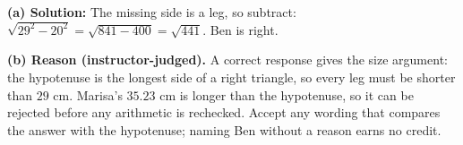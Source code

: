 \documentclass[12pt]{article}
\begin{document}

\textbf{(a) Solution:} \quad The missing side is a leg, so subtract:
$\sqrt{29^2 - 20^2} = \sqrt{841 - 400} = \sqrt{441}$. Ben is right.

\textbf{(b) Reason (instructor-judged).} A correct response gives the size argument: the
hypotenuse is the longest side of a right triangle, so every leg must be shorter than $29$ cm.
Marisa's $35.23$ cm is longer than the hypotenuse, so it can be rejected before any arithmetic is
rechecked. Accept any wording that compares the answer with the hypotenuse; naming Ben without a
reason earns no credit.
\end{document}
